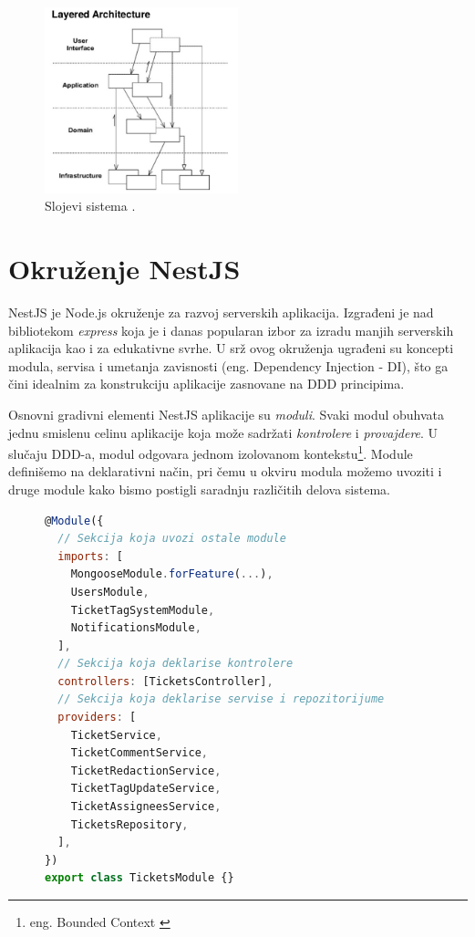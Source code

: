 \documentclass[12pt,oneside]{memoir}
\begin{document}
\begin{figure}[h]
  \centering
  \includegraphics[width=0.5\textwidth]{docs/images/ch_2/DDD-Layered-Architecture-2.png} 
  \caption{Slojevi sistema \cite{dddfull}.}
  \label{fig:sample}
\end{figure}

\section{Okruženje NestJS}

NestJS \cite{nestjsdocs} je Node.js okruženje za razvoj serverskih aplikacija. Izgrađeni je nad bibliotekom \textit{express} \cite{expressjsdocs} koja je i danas popularan izbor za izradu manjih serverskih aplikacija kao i za edukativne svrhe.  U srž ovog okruženja ugrađeni su koncepti modula, servisa i umetanja zavisnosti (eng. Dependency Injection - DI), što ga čini idealnim za konstrukciju aplikacije zasnovane na DDD principima.

Osnovni gradivni elementi NestJS aplikacije su \textit{moduli}. Svaki modul obuhvata jednu smislenu celinu aplikacije koja može sadržati \textit{kontrolere} i \textit{provajdere}. U slučaju DDD-a, modul odgovara jednom izolovanom kontekstu\footnote{eng. Bounded Context \cite{dddfull}}. Module definišemo na deklarativni način, pri čemu u okviru modula možemo uvoziti i druge module kako bismo postigli saradnju različitih delova sistema.

\begin{figure}[h]
\begin{lstlisting}[language=JavaScript, style=ES6, caption={Deklaracija modula za tikete.}]
@Module({
  // Sekcija koja uvozi ostale module
  imports: [
    MongooseModule.forFeature(...),
    UsersModule,
    TicketTagSystemModule,
    NotificationsModule,
  ],
  // Sekcija koja deklarise kontrolere
  controllers: [TicketsController],
  // Sekcija koja deklarise servise i repozitorijume
  providers: [
    TicketService,
    TicketCommentService,
    TicketRedactionService,
    TicketTagUpdateService,
    TicketAssigneesService,
    TicketsRepository,
  ],
})
export class TicketsModule {}
\end{lstlisting}
\end{figure}
\end{document}
